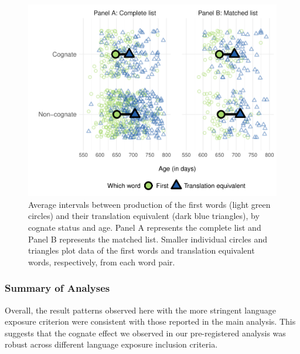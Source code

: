 \documentclass[
  ,man,floatsintext]{apa6}
\begin{document}
\begin{figure}

{\centering \includegraphics[width=1.2\linewidth]{CogVocab_supplemental_files/figure-latex/FigS3-1} 

}

\caption{Average intervals between production of the first words (light green circles) and their translation equivalent (dark blue triangles), by cognate status and age. Panel A represents the complete list and Panel B represents the matched list. Smaller individual circles and triangles plot data of the first words and translation equivalent words, respectively, from each word pair.}\label{fig:FigS3}
\end{figure}

\hypertarget{summary-of-analyses}{%
\subsubsection{Summary of Analyses}\label{summary-of-analyses}}

Overall, the result patterns observed here with the more stringent language exposure criterion were consistent with those reported in the main analysis. This suggests that the cognate effect we observed in our pre-registered analysis was robust across different language exposure inclusion criteria.
\end{document}
